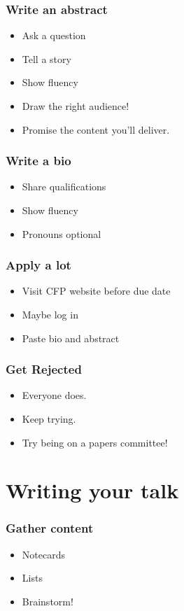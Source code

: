 \documentclass{beamer}
\begin{document}
\begin{frame}[fragile]
\frametitle{Write an abstract}
\begin{itemize}
\item Ask a question
\item Tell a story
\item Show fluency
\item Draw the right audience!
\item Promise the content you'll deliver.
\end{itemize}
\end{frame}

\begin{frame}[fragile]
\frametitle{Write a bio}
\begin{itemize}
\item Share qualifications
\item Show fluency
\item Pronouns optional
\end{itemize}
\end{frame}

\begin{frame}[fragile]
\frametitle{Apply a lot}
\begin{itemize}
\item Visit CFP website before due date
\item Maybe log in
\item Paste bio and abstract
\end{itemize}
\end{frame}

\begin{frame}[fragile]
\frametitle{Get Rejected}
\begin{itemize}
\item Everyone does.
\item Keep trying.
\item Try being on a papers committee!
\end{itemize}
\end{frame}

\section{Writing your talk}

\begin{frame}[fragile]
\tableofcontents[currentsection]
\end{frame}

\begin{frame}[fragile]
\frametitle{Gather content}
\begin{itemize}
\item Notecards
\item Lists
\item Brainstorm!
\end{itemize}
\end{frame}
\end{document}
